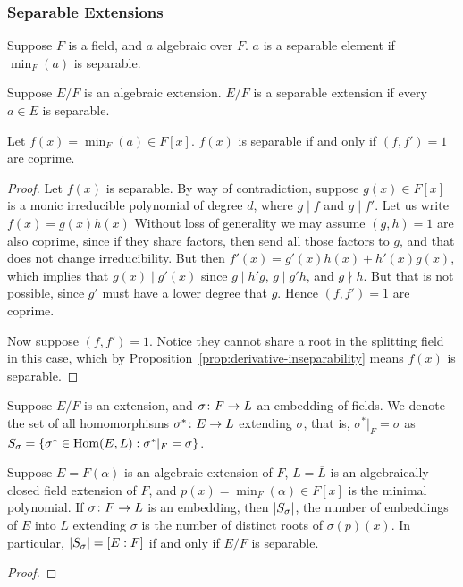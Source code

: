 \subsubsection*{Separable Extensions}

\begin{definition}
    Suppose \(F\) is a field, and \(a\) algebraic over \(F\).
    \(a\) is a separable element if \(\min_F(a)\) is separable.
\end{definition}
\begin{definition}
    Suppose \(E/F\) is an algebraic extension.
    \(E/F\) is a separable extension if every \(a \in E\) is separable.
\end{definition}

\begin{lemma}
    Let \(f(x) = \min_F(a) \in F[x]\).
    \(f(x)\) is separable if and only if \((f,f') = 1\) are coprime.
\end{lemma}
\begin{proof}
    Let \(f(x)\) is separable.
    By way of contradiction,
    suppose \(g(x) \in F[x]\) is a monic irreducible polynomial of degree \(d\),
    where \(g \mid f\) and \(g \mid f'\).
    Let us write \(f(x) = g(x)h(x)\)
    Without loss of generality we may assume \((g,h) = 1\) are also coprime,
    since if they share factors, then send all those factors to \(g\),
    and that does not change irreducibility.
    But then \(f'(x) = g'(x)h(x) + h'(x)g(x)\),
    which implies that \(g(x) \mid g'(x)\)
    since \(g \mid h'g\), \(g \mid g'h\), and \(g \nmid h\).
    But that is not possible, since \(g'\) must have a lower degree that \(g\).
    Hence \((f,f') = 1\) are coprime.

    Now suppose \((f,f') = 1\).
    Notice they cannot share a root in the splitting field in this case,
    which by Proposition~\ref{prop:derivative-inseparability}
    means \(f(x)\) is separable.
\end{proof}

\begin{definition}
    Suppose \(E/F\) is an extension,
    and \(\sigma\colon F\to L\) an embedding of fields.
    We denote the set of all homomorphisms \(\sigma^\ast\colon E\to L\)
    extending \(\sigma\), that is, \(\sigma^\ast\vert_F = \sigma\) as
    \(S_\sigma = \{\sigma^\ast\in\operatorname{Hom}(E,L) : \sigma^\ast\vert_F = \sigma\}\).
\end{definition}
\begin{theorem}\label{thm:simple-extension-hom-count}
    Suppose \(E = F(\alpha)\) is an algebraic extension of \(F\),
    \(L = \overline{L}\) is an algebraically closed field extension of \(F\),
    and \(p(x) = \min_F(\alpha) \in F[x]\) is the minimal polynomial.
    If \(\sigma\colon F\to L\) is an embedding,
    then \(\abs{S_\sigma}\),
    the number of embeddings of \(E\) into \(L\) extending \(\sigma\)
    is the number of distinct roots of \(\sigma(p)(x)\).
    In particular, \(\abs{S_\sigma} = [E:F]\)
    if and only if \(E/F\) is separable.
\end{theorem}
\begin{proof}
\end{proof}

